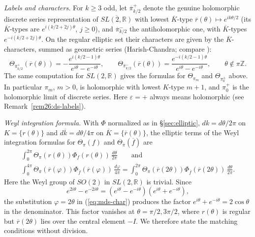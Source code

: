\documentclass[12pt,letterpaper,openany]{book}
\theoremstyle{plain}
\theoremstyle{definition}
\theoremstyle{remark}
\theoremstyle{remark}
\begin{document}
\emph{Labels and characters.} For $k\geq 3$ odd, let
$\overline{\pi}{}^{+}_{k/2}$ denote the genuine holomorphic discrete series
representation of $\overline{SL(2,{\mathbb R})}$ with lowest
$\overline{K}$-type $\overline{r}(\theta)\mapsto e^{ik\theta/2}$ (its
$\overline K$-types are $e^{i(k/2+2j)\theta}$, $j\geq0$), and
$\overline{\pi}{}^{-}_{k/2}$ the antiholomorphic one, with
$\overline K$-types $e^{-i(k/2+2j)\theta}$. On the regular elliptic set
their characters are given by the $\overline K$-characters, summed as
geometric series (Harish-Chandra; compare \cite{Ad2}):
\begin{equation}\label{eq:mds-char}
\Theta_{\overline{\pi}{}^{+}_{k/2}}(\overline r(\theta))
=-\frac{e^{i(k/2-1)\theta}}{e^{i\theta}-e^{-i\theta}},\qquad
\Theta_{\overline{\pi}{}^{-}_{k/2}}(\overline r(\theta))
=\frac{e^{-i(k/2-1)\theta}}{e^{i\theta}-e^{-i\theta}},\qquad
\theta\notin\pi{\mathbb Z}.
\end{equation}
The same computation for $SL(2,{\mathbb R})$ gives the formulas for
$\Theta_{\pi_m}$ and $\Theta_{\pi_0^\pm}$ above. In particular $\pi_m$,
$m>0$, is holomorphic with lowest $K$-type $m+1$, and $\pi_0^+$ is the
holomorphic limit of discrete series. Here $\varepsilon=+$ always means
holomorphic (see Remark~\ref{rem26:ds-labels}).

\emph{Weyl integration formula.} With $\Phi$ normalized as in
\S\ref{sec:elliptic}, $dk=d\theta/2\pi$ on $K=\{r(\theta)\}$ and
$d\overline k=d\theta/4\pi$ on $\overline K=\{\overline r(\theta)\}$,
the elliptic terms of the Weyl integration formulas for $\Theta_{\pi}(f)$
and $\Theta_{\overline\pi}(\overline f)$ are
\begin{gather*}
\int_0^{2\pi }\Theta _{\pi}(r(\theta ))\Phi_f(r(\theta ))\,\frac{d\theta}{2\pi}
\qquad\text{and}\\
\int_0^{4\pi }
\Theta _{\overline{\pi }}(\overline{r}(\varphi ))
\Phi_{\overline{f}}(\overline{r}(\varphi ))\,\frac{d\varphi}{4\pi}
=\int_0^{2\pi }
\Theta _{\overline{\pi }}(\overline{r}(2\theta ))
\Phi_{\overline{f}}(\overline{r}(2\theta ))\,\frac{d\theta}{2\pi}.
\end{gather*}
Here the Weyl group of $SO(2)$ in $SL(2,{\mathbb R})$ is trivial. Since
\[
e^{2i\theta}-e^{-2i\theta}=(e^{i\theta}-e^{-i\theta})(e^{i\theta}+e^{-i\theta}),
\]
the substitution $\varphi=2\theta$ in (\ref{eq:mds-char}) produces the
factor $e^{i\theta}+e^{-i\theta}=2\cos\theta$ in the denominator. This
factor vanishes at $\theta=\pi/2,3\pi/2$, where $r(\theta)$ is regular
but $\overline r(2\theta)$ lies over the central element $-I$. We
therefore state the matching conditions without division.
\end{document}
